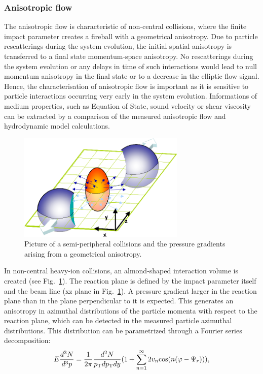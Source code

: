 \subsubsection{Anisotropic flow}
\label{sec:AnisotropicFlow}
The anisotropic flow is characteristic of non-central collisions, where the 
finite impact parameter creates a fireball with a geometrical anisotropy. 
Due to particle rescatterings during the system evolution, the initial spatial 
anisotropy is transferred to a final state momentum-space anisotropy. No
 rescatterings during the system evolution or any delays in time of such 
 interactions would lead to null momentum anisotropy in the final state or
  to a decrease in the elliptic flow signal. Hence, the characterisation of 
  anisotropic flow is important as it is sensitive to particle interactions occurring very 
  early in the system evolution. Informations of medium properties, such as Equation of 
  State, sound velocity or shear viscosity can be extracted by a comparison 
  of the measured anisotropic flow and hydrodynamic model calculations.
\begin{figure}[!ht]
  \centering
  \includegraphics[width=8cm]{FigCap1/elliptic_flow_3D_medium.png}
  \caption{Picture of a semi-peripheral collisions and the pressure gradients arising from a geometrical anisotropy.}
  \label{fig:elliptic_flow_3D_medium}
\end{figure}
In non-central heavy-ion collisions, an almond-shaped interaction 
volume is created (see Fig.~\ref{fig:elliptic_flow_3D_medium}).
The reaction plane is defined by the impact parameter itself and the 
beam line (xz plane in Fig.~\ref{fig:elliptic_flow_3D_medium}). 
A pressure gradient larger in the
 reaction plane than in the plane perpendicular to it is expected. This generates an
  anisotropy in azimuthal distributions of the particle momenta with 
  respect to the reaction plane, which can be detected in the measured
   particle azimuthal distributions. This distribution can be parametrized 
   through a Fourier series decomposition:
\begin{equation}
\label{eq:FourierAzimuthExpansion}
E \frac{d^3N}{d^3p} = \frac{1}{2\pi} \frac{d^2N}{p_{\rm T} dp_{\rm T} dy} (1 + \sum_{n=1}^\infty 2v_n {\rm cos} (n(\varphi - \Psi_r))),
\end{equation}
